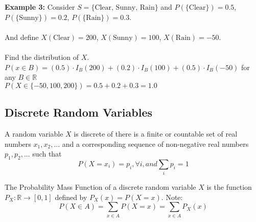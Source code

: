 \documentclass[12pt]{article}
\begin{document}
\textbf{Example 3:} Consider $S = \{ \text{Clear, Sunny, Rain} \}$ and $P(\{ \text{Clear} \}) = 0.5$, $P(\{ \text{Sunny} \}) = 0.2$, $P(\{ \text{Rain} \}) = 0.3$.\\
\\
And define $X(\text{Clear}) = 200$, $X(\text{Sunny}) = 100$, $X(\text{Rain}) = -50$.\\
\\
Find the distribution of $X$.\\
$P(x \in B) = (0.5) \cdot I_B (200) + (0.2) \cdot I_B (100) + (0.5) \cdot I_B (-50)$ for any $B \in \mathbb{R}$\\
$P(X \in \{ -50, 100, 200 \}) = 0.5 + 0.2 + 0.3 = 1.0$

\subsection{Discrete Random Variables}

\begin{tcolorbox}[title=Definition: Discrete Random Variables]
	A random variable $X$ is discrete of there is a finite or countable set of real numbers $x_1, x_2, ...$ and a corresponding sequence of non-negative real numbers $p_1, p_2, ...$ such that
	$$P(X = x_i) = p_i, \forall i, and \sum_{i} p_i = 1$$
\end{tcolorbox}

\begin{tcolorbox}[title=Probability Mass Function]
	The Probability Mass Function of a discrete random variable $X$ is the function $P_X : \mathbb{R} \rightarrow [ 0,1 ]$ defined by $P_X (x) = P(X = x)$. Note: $$P(X \in A) = \sum_{x \in A} P(X = x) = \sum_{x \in A} P_X (x)$$
\end{tcolorbox}
\end{document}
